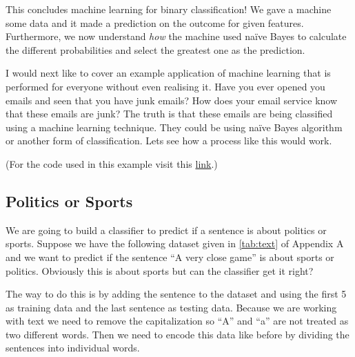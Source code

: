 \documentclass[12pt,twoside]{report}   %
\newcommand{\ti}{\textit}
\begin{document}
This concludes machine learning for binary classification! We gave a machine some data and it made a prediction on the outcome for given features. Furthermore, we now understand \ti{how} the machine used na\"{i}ve Bayes to calculate the different probabilities and select the greatest one as the prediction. 

I would next like to cover an example application of machine learning that is performed for everyone without even realising it. Have you ever opened you emails and seen that you have junk emails? How does your email service know that these emails are junk? The truth is that these emails are being classified using a machine learning technique. They could be using na\"{i}ve Bayes algorithm or another form of classification. Lets see how a process like this would work.

(For the code used in this example visit this \href{https://github.com/iMikeT/MathProject2/tree/master/Python%20Code/Baseball%20Classification}{link}.)

\subsection{Politics or Sports}\label{sports example}
\vspace{-0.35in}
\underline{\hspace{6.2in}}
\vspace{-0.1in}

We are going to build a classifier to predict if a sentence is about politics or sports. Suppose we have the following dataset given in \ref{tab:text} of Appendix A and we want to predict if the sentence ``A very close game'' is about sports or politics. Obviously this is about sports but can the classifier get it right?

The way to do this is by adding the sentence to the dataset and using the first 5 as training data and the last sentence as testing data. Because we are working with text we need to remove the capitalization so ``A'' and ``a'' are not treated as two different words. Then we need to encode this data like before by dividing the sentences into individual words.
\end{document}

